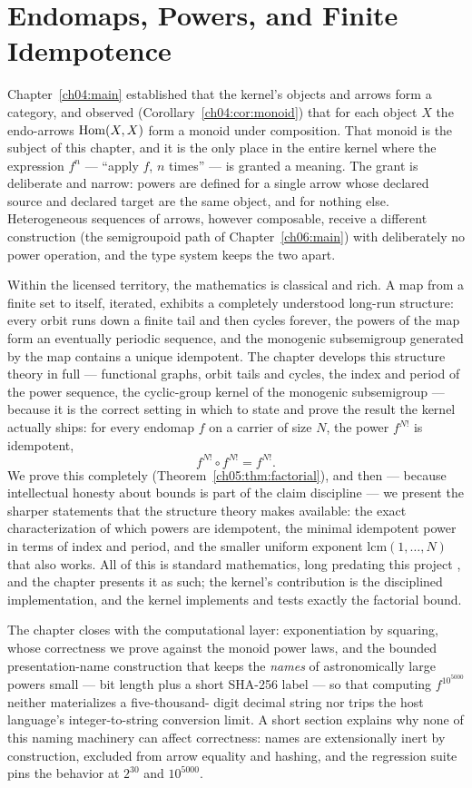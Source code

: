 \chapter{Endomaps, Powers, and Finite Idempotence}
\label{ch05:main}

Chapter~\ref{ch04:main} established that the kernel's objects and arrows
form a category, and observed (Corollary~\ref{ch04:cor:monoid}) that for
each object $X$ the endo-arrows $\mathrm{Hom}(X, X)$ form a monoid under
composition. That monoid is the subject of this chapter, and it is the only
place in the entire kernel where the expression $f^{n}$ --- ``apply $f$,
$n$ times'' --- is granted a meaning. The grant is deliberate and narrow:
powers are defined for a single arrow whose declared source and declared
target are the same object, and for nothing else. Heterogeneous sequences of
arrows, however composable, receive a different construction (the
semigroupoid path of Chapter~\ref{ch06:main}) with deliberately no power
operation, and the type system keeps the two apart.

Within the licensed territory, the mathematics is classical and rich. A
map from a finite set to itself, iterated, exhibits a completely understood
long-run structure: every orbit runs down a finite tail and then cycles
forever, the powers of the map form an eventually periodic sequence, and the
monogenic subsemigroup generated by the map contains a unique idempotent.
The chapter develops this structure theory in full --- functional graphs,
orbit tails and cycles, the index and period of the power sequence, the
cyclic-group kernel of the monogenic subsemigroup --- because it is the
correct setting in which to state and prove the result the kernel actually
ships: for every endomap $f$ on a carrier of size $N$, the power $f^{N!}$
is idempotent,
\[
  f^{N!} \circ f^{N!} = f^{N!}.
\]
We prove this completely (Theorem~\ref{ch05:thm:factorial}), and then ---
because intellectual honesty about bounds is part of the claim discipline
--- we present the sharper statements that the structure theory makes
available: the exact characterization of which powers are idempotent, the
minimal idempotent power in terms of index and period, and the smaller
uniform exponent $\mathrm{lcm}(1, \dots, N)$ that also works. All of this is
standard mathematics, long predating this project
\cite{pin, howie}, and the chapter presents it as such; the kernel's
contribution is the disciplined implementation, and the kernel implements
and tests exactly the factorial bound.

The chapter closes with the computational layer: exponentiation by
squaring, whose correctness we prove against the monoid power laws, and the
bounded presentation-name construction that keeps the \emph{names} of
astronomically large powers small --- bit length plus a short SHA-256 label
--- so that computing $f^{10^{5000}}$ neither materializes a five-thousand-
digit decimal string nor trips the host language's integer-to-string
conversion limit. A short section explains why none of this naming
machinery can affect correctness: names are extensionally inert by
construction, excluded from arrow equality and hashing, and the regression
suite pins the behavior at $2^{30}$ and $10^{5000}$.

